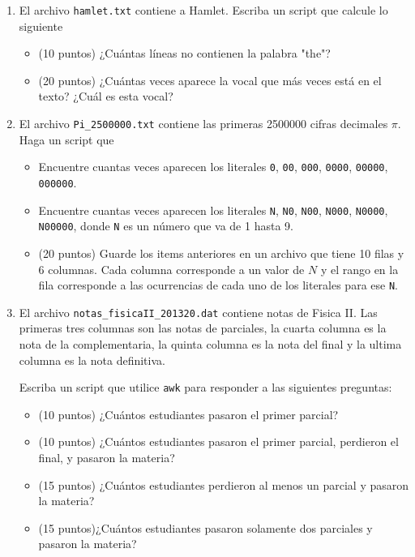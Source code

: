 \documentclass{article}
\begin{document}
\begin{enumerate}

\item El archivo \verb"hamlet.txt" contiene a Hamlet. Escriba un
  script que calcule lo siguiente
\begin{itemize}
\item (10 puntos) ¿Cu\'antas l\'ineas no contienen la palabra "the"?
\item (20 puntos) ¿Cu\'antas veces aparece la vocal que m\'as veces est\'a en el
  texto? ¿Cuál es esta vocal? 
\end{itemize}

\item
El archivo \verb"Pi_2500000.txt" contiene las primeras 2500000 cifras
decimales $\pi$.  Haga un script que 
\begin{itemize}
\item Encuentre cuantas veces aparecen los literales \verb"0",
  \verb"00", \verb"000", \verb"0000", \verb"00000", \verb"000000".
\item Encuentre cuantas veces aparecen los literales \verb"N",
  \verb"N0", \verb"N00", \verb"N000", \verb"N0000", \verb"N00000",
  donde \verb"N" es un n\'umero que va de 1 hasta 9.
\item (20 puntos) Guarde los items anteriores en un archivo que tiene
  10 filas y 6 columnas. Cada columna corresponde a un valor de $N$ y
  el rango en la fila corresponde a las ocurrencias de cada uno de los
  literales para ese \verb"N".
\end{itemize}


\item
El archivo \verb"notas_fisicaII_201320.dat" contiene notas de
Fisica II. Las primeras tres columnas son las notas de parciales, la
cuarta columna es la nota de la complementaria, la quinta columna es
la nota del final y la ultima columna es la nota definitiva. 

Escriba un script que utilice \verb"awk" para responder a las
siguientes preguntas: 
\begin{itemize}
\item (10 puntos) ¿Cu\'antos estudiantes pasaron el primer parcial?
\item (10 puntos) ¿Cu\'antos estudiantes pasaron el primer parcial,
  perdieron el final, y pasaron la materia?
\item (15 puntos) ¿Cu\'antos estudiantes perdieron al menos un parcial
  y pasaron la materia?
\item (15 puntos)¿Cu\'antos estudiantes pasaron solamente dos
  parciales y pasaron la materia? 
\end{itemize}


\end{enumerate}
\end{document}
